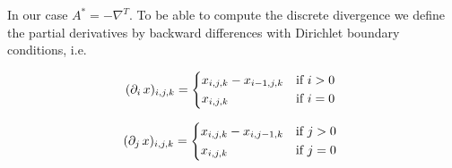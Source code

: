 

                \begin{describe}
                    In our case $A^{*} = -\nabla^{T}$. To be able to compute the discrete divergence we define the partial derivatives by backward differences with Dirichlet boundary conditions, i.e.
                    \begin{center}
                        \begin{minipage}{0.4\textwidth}
                            \[
                                (\partial_{i}\,x)_{i, j, k} =
                                    \begin{dcases*}
                                        x_{i, j, k} - x_{i-1, j, k} & \textnormal{if $i > 0$}\\
                                        x_{i, j, k} & \textnormal{if $i = 0$}
                                    \end{dcases*}
                            \]
                        \end{minipage}\hspace{1cm}
                        \begin{minipage}{0.4\textwidth}
                            \[
                                (\partial_{j}\,x)_{i, j, k} =
                                    \begin{dcases*}
                                        x_{i, j, k} - x_{i, j-1, k} & \textnormal{if $j > 0$}\\
                                        x_{i, j, k} & \textnormal{if $j = 0$}
                                    \end{dcases*}
                            \]
                        \end{minipage}

\end{center}
\end{describe}

